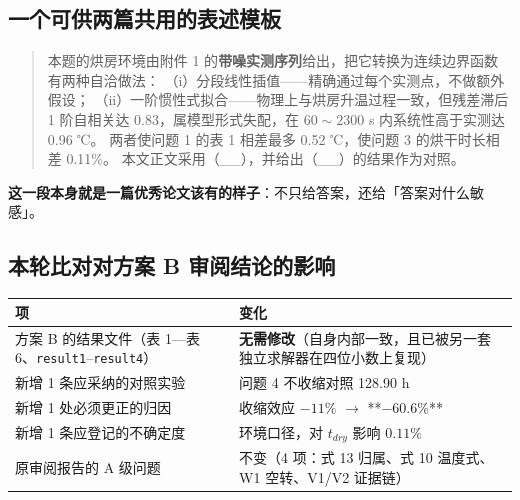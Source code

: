 \subsection{一个可供两篇共用的表述模板}


\begin{quote}
本题的烘房环境由附件 1 的\textbf{带噪实测序列}给出，把它转换为连续边界函数有两种自洽做法： （i）分段线性插值——精确通过每个实测点，不做额外假设； （ii）一阶惯性式拟合——物理上与烘房升温过程一致，但残差滞后 1 阶自相关达 0.83，属模型形式失配，在 $60\sim2300$ s 内系统性高于实测达 0.96 ℃。 两者使问题 1 的表 1 相差最多 0.52 ℃，使问题 3 的烘干时长相差 0.11\%。 本文正文采用（\_\_），并给出（\_\_）的结果作为对照。
\end{quote}


\textbf{这一段本身就是一篇优秀论文该有的样子}：不只给答案，还给「答案对什么敏感」。


\subsection{本轮比对对方案 B 审阅结论的影响}


\begin{center}
\small
\begin{tabular}{ll}
\toprule
项 & 变化 \\
\midrule
方案 B 的结果文件（表 1—表 6、\texttt{result1}–\texttt{result4}） & \textbf{无需修改}（自身内部一致，且已被另一套独立求解器在四位小数上复现） \\
新增 1 条应采纳的对照实验 & 问题 4 不收缩对照 128.90 h \\
新增 1 处必须更正的归因 & 收缩效应 $-11\%$ $\rightarrow$ **$-60.6\%$** \\
新增 1 条应登记的不确定度 & 环境口径，对 $t_{dry}$ 影响 $0.11\%$ \\
原审阅报告的 A 级问题 & 不变（4 项：式 13 归属、式 10 温度式、W1 空转、V1/V2 证据链） \\
\bottomrule
\end{tabular}
\end{center}

